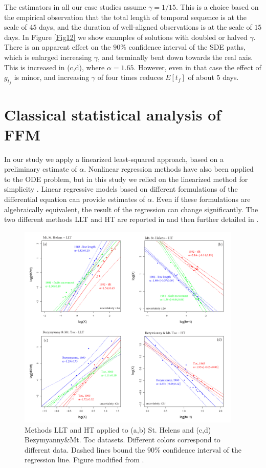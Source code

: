 \documentclass{article}
\begin{document}
The estimators in all our case studies assume $\gamma=1/15$.  This is a choice based on the empirical observation that the total length of temporal sequence is at the scale of $45$ days, and the duration of well-aligned observations is at the scale of $15$ days. In Figure \ref{Fig12} we show examples of solutions with doubled or halved $\gamma$. There is an apparent effect on the $90\%$ confidence interval of the SDE paths, which is enlarged increasing $\gamma$, and terminally bent down towards the real axis. This is increased in (c,d), where $\alpha=1.65$. However, even in that case the effect of $g_{t_f}$ is minor, and increasing $\gamma$ of four times reduces $E[t_f]$ of about $5$ days.

\section{Classical statistical analysis of FFM}\label{A-1}
In our study we apply a linearized least-squared approach, based on a preliminary estimate of $\alpha$. Nonlinear regression methods have also been applied to the ODE problem, but in this study we relied on the linearized method for simplicity \citep{Bell2011}. Linear regressive models based on different formulations of the differential equation can provide estimates of $\alpha$. Even if these formulations are algebraically equivalent, the result of the regression can change significantly. The two different methods LLT and HT are reported in \cite{Voight1988} and then further detailed in \cite{Cornelius1995}.

\begin{figure}[H]
\centering
\includegraphics[width=0.95\textwidth]{Fig4_plus.png}
\vskip-0.5cm\caption{Methods LLT and HT applied to (a,b) St. Helens and (c,d) Bezymyanny\&Mt. Toc datasets. Different colors correspond to different data. Dashed lines bound the $90\%$ confidence interval of the regression line. Figure modified from \cite{Voight1988}.}
\label{Fig4}
\end{figure}
\end{document}
